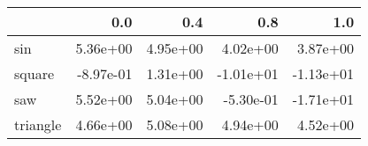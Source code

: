 \begin{tabular}{lrrrr}
\toprule
{} &       0.0 &      0.4 &       0.8 &       1.0 \\
\midrule
sin      &  5.36e+00 & 4.95e+00 &  4.02e+00 &  3.87e+00 \\
square   & -8.97e-01 & 1.31e+00 & -1.01e+01 & -1.13e+01 \\
saw      &  5.52e+00 & 5.04e+00 & -5.30e-01 & -1.71e+01 \\
triangle &  4.66e+00 & 5.08e+00 &  4.94e+00 &  4.52e+00 \\
\bottomrule
\end{tabular}
